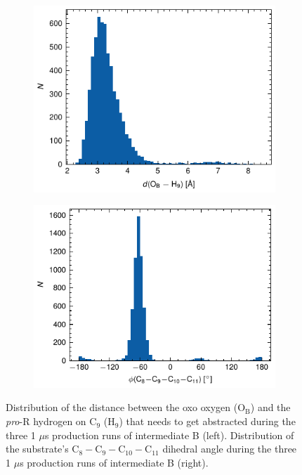 \begin{figure}[htbp]
    \centering
    \begin{subfigure}{.49\textwidth}
        \centering
        \includegraphics{Figures/B_Ob-H9_hist.pdf}
    \end{subfigure}
    \begin{subfigure}{.49\textwidth}
        \centering
        \includegraphics{Figures/B_C9-C10_hist.pdf}
    \end{subfigure}
    \caption{Distribution of the distance between the oxo oxygen (O$_{\text{B}}$) and the \textit{pro}-R hydrogen on C$_{9}$ (H$_{9}$) that needs to get abstracted during the three 1 $\mu$s production runs of intermediate B (left). Distribution of the substrate's C$_8-$C$_9-$C$_{10}-$C$_{11}$ dihedral angle during the three 1 $\mu$s production runs of intermediate B (right).}
    \label{fig:B_production}
\end{figure}
